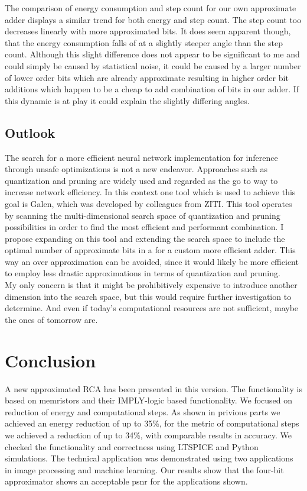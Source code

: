 \documentclass[]{IEEEtran}
\begin{document}
The comparison of energy consumption and step count for our own approximate adder displays a similar trend for both energy and step count. The step count too decreases linearly with more approximated bits. It does seem apparent though, that the energy consumption falls of at a slightly steeper angle than the step count. Although this slight difference does not appear to be significant to me and could simply be caused by statistical noise, it could be caused by a larger number of lower order bits which are already approximate resulting in higher order bit additions which happen to be a cheap to add combination of bits in our adder. If this dynamic is at play it could explain the slightly differing angles. 




\subsection{Outlook}
The search for a more efficient neural network implementation for inference through unsafe optimizations is not a new endeavor. Approaches such as quantization and pruning are widely used and regarded as the go to way to increase network efficiency. In this context one tool which is used to achieve this goal is Galen, which was developed by colleagues from ZITI. This tool operates by scanning the multi-dimensional search space of quantization and pruning possibilities in order to find the most efficient and performant combination. I propose expanding on this tool and extending the search space to include the optimal number of approximate bits in a for a custom more efficient adder. This way an over approximation can be avoided, since it would likely be more efficient to employ less drastic approximations in terms of quantization and pruning. \\
My only concern is that it might be prohibitively expensive to introduce another dimension into the search space, but this would require further investigation to determine. And even if today's computational resources are not sufficient, maybe the ones of tomorrow are. 


\section{Conclusion}
A new approximated RCA has been presented in this version. The functionality is based on memristors and their IMPLY-logic based functionality. We focused on reduction of energy and computational steps. As shown in privious parts we achieved an energy reduction of up to 35\%, for the metric of computational steps we achieved a reduction of up to 34\%, with comparable results in accuracy. We checked the functionality and correctness using LTSPICE and Python simulations. The technical application was demonstrated using two applications in image processing and machine learning. Our results show that the four-bit approximator shows an acceptable \gls{psnr} for the applications shown.
\end{document}
